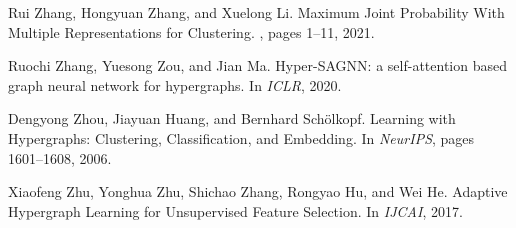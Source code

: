 \documentclass[11pt]{article}
\begin{document}
\begin{thebibliography}{10}
Rui Zhang, Hongyuan Zhang, and Xuelong Li.
\newblock Maximum {Joint} {Probability} {With} {Multiple} {Representations} for
  {Clustering}.
, pages 1--11, 2021.

Ruochi Zhang, Yuesong Zou, and Jian Ma.
\newblock Hyper-{SAGNN}: a self-attention based graph neural network for
  hypergraphs.
\newblock In {\em ICLR}, 2020.

Dengyong Zhou, Jiayuan Huang, and Bernhard Schölkopf.
\newblock Learning with {Hypergraphs}: {Clustering}, {Classification}, and
  {Embedding}.
\newblock In {\em NeurIPS}, pages 1601--1608, 2006.

Xiaofeng Zhu, Yonghua Zhu, Shichao Zhang, Rongyao Hu, and Wei He.
\newblock Adaptive {Hypergraph} {Learning} for {Unsupervised} {Feature}
  {Selection}.
\newblock In {\em IJCAI}, 2017.

\end{thebibliography}
\end{document}
